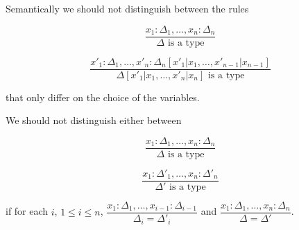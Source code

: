 \begin{example}
    Semantically we should not distinguish between the rules

    \begin{minipage}{0.4\textwidth} %
    \begin{equation*}
        \dfrac{
            x_1 : \Delta_1, \dots, x_n : \Delta_n
        }{
            \Delta \text{ is a type}
        }
    \end{equation*}
    \end{minipage}
    \begin{minipage}{0.6\textwidth}
    \begin{equation*}
        \dfrac{
            x'_1 : \Delta_1, \dots, x'_n : \Delta_n[x'_1 | x_1, \dots, x'_{n-1} | x_{n-1}]
        }{
            \Delta[x'_1 | x_1, \dots, x'_n | x_n] \text{ is a type}
        }
    \end{equation*}
    \end{minipage}
    that only differ on the choice of the variables.
\end{example}

\begin{example}
    We should not distinguish either between 

    \begin{minipage}{0.5\textwidth} %
    \begin{equation*}
        \dfrac{
            x_1 : \Delta_1, \dots, x_n : \Delta_n
        }{
            \Delta \text{ is a type}
        }
    \end{equation*}
    \end{minipage}
    \begin{minipage}{0.5\textwidth}
    \begin{equation*}
        \dfrac{
            x_1 : \Delta'_1, \dots, x_n : \Delta'_n
        }{
            \Delta' \text{ is a type}
        }
    \end{equation*}
    \end{minipage}
    if for each $i$, $1 \leq i \leq n$, \(
        \dfrac{
            x_1 : \Delta_1, \dots, x_{i-1} : \Delta_{i-1}
        }{
            \Delta_i = \Delta'_i
        }
    \) and \(
        \dfrac{
            x_1 : \Delta_1, \dots, x_n : \Delta_n
        }{
            \Delta = \Delta'
        }
    \).
\end{example}

